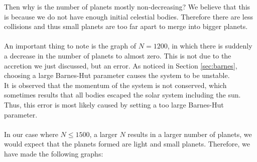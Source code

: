 Then why is the number of planets mostly non-decreasing? We believe that this is because we do not have enough initial celestial bodies. Therefore there are less collisions and thus small planets are too far apart to merge into bigger planets.\\
\\
An important thing to note is the graph of $N=1200$, in which there is suddenly a decrease in the number of planets to almost zero. This is not due to the accretion we just discussed, but an error. As noticed in Section \ref{sec:barnes}, choosing a large Barnes-Hut parameter causes the system to be unstable.\\
It is observed that the momentum of the system is not conserved, which sometimes results that all bodies escaped the solar system including the sun. Thus, this error is most likely caused by setting a too large Barnes-Hut parameter.\\
\\
In our case where $N\leq 1500$, a larger $N$ results in a larger number of planets, we would expect that the planets formed are light and small planets. Therefore, we have made the following graphs:
